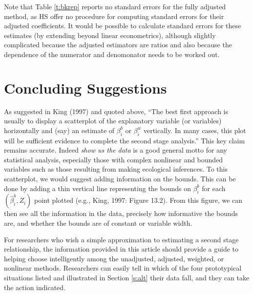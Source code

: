 \documentclass[11pt,titlepage]{article}
\begin{document}
Note that Table \ref{t:bkrep} reports no standard errors for the fully
adjusted method, as HS offer no procedure for computing standard
errors for their adjusted coefficients.  It would be possible to
calculate standard errors for these estimates (by extending beyond
linear econometrics), although slightly complicated because the
adjusted estimators are ratios and also because the dependence of the
numerator and denomonator needs to be worked out.

\section{Concluding Suggestions}

As suggested in King (1997) and quoted above, ``The best first
approach is usually to display a scatterplot of the explanatory
variable (or variables) horizontally and (say) an estimate of
$\beta_i^b$ or $\beta_i^w$ vertically.  In many cases, this plot will
be sufficient evidence to complete the second stage analysis.''  This
key claim remains accurate.  Indeed \emph{show us the data} is a good
general motto for any statistical analysis, especially those with
complex nonlinear and bounded variables such as those resulting from
making ecological inferences.  To this scatterplot, we would suggest
adding information on the bounds.  This can be done by adding a thin
vertical line representing the bounds on $\beta_i^b$ for each
$(\hat\beta_i^b,Z_i)$ point plotted (e.g., King, 1997: Figure 13.2).
From this figure, we can then see all the information in the data,
precisely how informative the bounds are, and whether the bounds are
of constant or variable width.

For researchers who wish a simple approximation to estimating a second
stage relationship, the information provided in this article should
provide a guide to helping choose intelligently among the unadjusted,
adjusted, weighted, or nonlinear methods.  Researchers can easily tell
in which of the four prototypical situations listed and illustrated in
Section \ref{s:alt} their data fall, and they can take the action
indicated.
\end{document}
